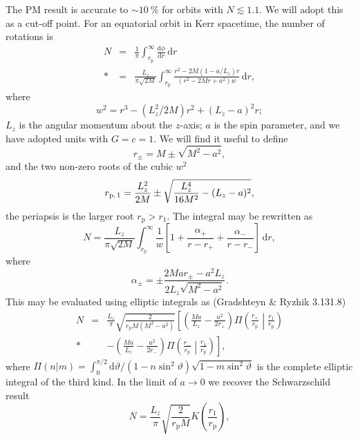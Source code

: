 \documentclass[aps,prd,reprint,showpacs,groupedaddress]{revtex4-1}
\newcommand{\sub}[1]{\ensuremath{_\text{#1}}}
\newcommand{\dd}{\ensuremath{\mathrm{d}}}
\newcommand{\diff}[2]{\ensuremath{\frac{\dd {#1}}{\dd {#2}}}}
\newcommand{\intd}[4]{\ensuremath{\int_{#1}^{#2}{#3}\,\dd{#4}}}
\newcommand{\recip}[1]{\ensuremath{\frac{1}{#1}}}
\begin{document}
The PM result is accurate to $\sim \SI{10}{\percent}$ for orbits with $N \lesssim 1.1$. We will adopt this as a cut-off point. For an equatorial orbit in Kerr spacetime, the number of rotations is
\begin{eqnarray}
N & = & \recip{\pi}\intd{r\sub{p}}{\infty}{\diff{\phi}{r}}{r} \nonumber \\*
 & = & \frac{L_z}{\pi\sqrt{2M}}\intd{r\sub{p}}{\infty}{\frac{r^2 - 2M(1 - a/L_z)r}{(r^2 - 2Mr + a^2)w}}{r},
\end{eqnarray}
where
\begin{equation}
w^2 = r^3 - (L_z^2/2M)r^2 + (L_z - a)^2r;
\end{equation}
$L_z$ is the angular momentum about the $z$-axis; $a$ is the spin parameter, and we have adopted units with $G = c = 1$. We will find it useful to define
\begin{equation}
r_\pm = M \pm \sqrt{M^2 - a^2},
\end{equation}
and the two non-zero roots of the cubic $w^2$
\begin{equation}
r\sub{\text{p},\,1} = \frac{L_z^2}{2M} \pm \sqrt{\frac{L_z^4}{16M^2} - (L_z -a)^2},
\end{equation}
the periapsis is the larger root $r\sub{p} > r_1$. The integral may be rewritten as
\begin{equation}
N = \frac{L_z}{\pi\sqrt{2M}}\intd{r\sub{p}}{\infty}{\recip{w}\left[1 + \frac{\alpha_+}{r-r_+} + \frac{\alpha_-}{r-r_-}\right]}{r},
\end{equation}
where
\begin{equation}
\alpha_\pm = \pm\frac{2Mar_\pm - a^2L_z}{2L_z\sqrt{M^2-a^2}}.
\end{equation}
This may be evaluated using elliptic integrals as (Gradshteyn \& Ryzhik\cite{Gradshteyn2000} 3.131.8)
\begin{eqnarray}
N & = & \frac{L_z}{\pi}\sqrt{\frac{2}{r\sub{p}M(M^2-a^2)}}\left[\left(\frac{Ma}{L_z} - \frac{a^2}{2r_+}\right)\Pi\left(\frac{r_+}{r\sub{p}}\middle|\frac{r_1}{r\sub{p}}\right) \right. \nonumber \\*
 & & \left. - \left(\frac{Ma}{L_z} - \frac{a^2}{2r_-}\right)\Pi\left(\frac{r_-}{r\sub{p}}\middle|\frac{r_1}{r\sub{p}}\right)\right],
\end{eqnarray}
where $\Pi(n|m) = \int_{0}^{\pi/2}{\dd\vartheta/(1-n\sin^2\vartheta)\sqrt{1-m\sin^2\vartheta}}$ is the complete elliptic integral of the third kind. In the limit of $a \rightarrow 0$ we recover the Schwarzschild result\cite{Cutler1994}
\begin{equation}
N = \frac{L_z}{\pi}\sqrt{\frac{2}{r\sub{p}M}}K\left(\frac{r_1}{r\sub{p}}\right),
\end{equation}
\end{document}
